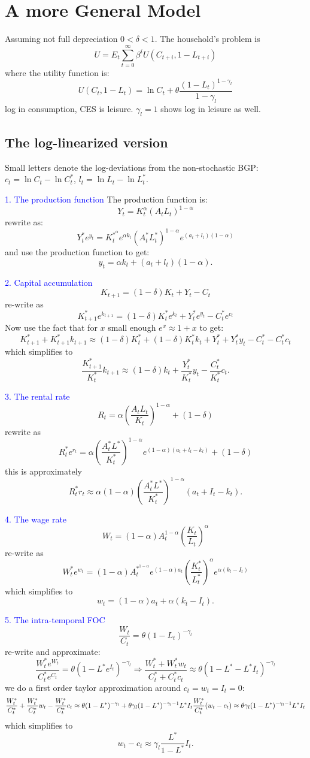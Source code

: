 \section{A more General Model}
Assuming not full depreciation $0 < \delta < 1$. The household's problem is
\[ 
U = E_t \sum_{t=0}^{\infty} \beta^i U(C_{t+i} , 1 - L_{t+i} )
\]
where the utility function is:
\[
U(C_t, 1-L_t) = \ln C_t + \theta \frac{(1-L_t)^{1-\gamma_l}}{1-\gamma_l}
\]
log in consumption, CES is leisure. $\gamma_l = 1$ shows log in leisure as well. 

\subsection{The log-linearized version}
Small letters denote the log-deviations from the non-stochastic BGP:
$c_t = \ln C_t - \ln C_t^{\ast}$, $l_t = \ln L_t - \ln L_t^{\ast}.$


\textcolor{blue}{1. The production function}
The production function is:
\[ Y_t = K_t^{\alpha} (A_t L_t)^{1-\alpha} \]
rewrite as:
\[ Y_t^{*} e^{y_t} = K^{*^{\alpha}} _t e^{\alpha k_t}(A_t^* L_t^*)^{1-\alpha }e^{(a_t + l_t)(1-\alpha )}  \]
and use the production function to get:
\[ y_t = \alpha k_t + (a_t + l_t)(1-\alpha ).\]

\textcolor{blue}{2. Capital accumulation}
$$K_{t+1}=(1-\delta)K_t+Y_t-C_t$$
re-write as
$$K_{t+1}^*e^{k_{t+1}}=(1-\delta)K_t^*e^{k_t}+Y_t^*e^{y_t}-C_t^*e^{c_t}$$
Now use the fact that for $x$ small enough $e^x\approx1+x$ to get:
$$K_{t+1}^{*}+K_{t+1}^{*}k_{t+1}\approx(1-\delta)K_{t}^{*}+(1-\delta)K_{t}^{*}k_{t}+Y_{t}^{*}+Y_{t}^{*}y_{t}-C_{t}^{*}-C_{t}^{*}c_{t}$$
which simplifies to
$$\frac{K_{t+1}^*}{K_t^*}k_{t+1}\approx(1-\delta)k_t+\frac{Y_t^*}{K_t^*}y_t-\frac{C_t^*}{K_t^*}c_t.$$

\textcolor{blue}{3. The rental rate}
$$R_t=\alpha\left(\frac{A_tL_t}{K_t}\right)^{1-\alpha}+(1-\delta)$$
rewrite as
$$R_t^*e^{r_t}=\alpha\left(\frac{A_t^*L^*}{K_t^*}\right)^{1-\alpha}e^{(1-\alpha)(a_t+l_t-k_t)}+(1-\delta)$$
this is approximately
$$R_t^*r_t\approx\alpha(1-\alpha)\left(\frac{A_t^*L^*}{K_t^*}\right)^{1-\alpha}(a_t+I_t-k_t).$$

\textcolor{blue}{4. The wage rate}
$$W_t=(1-\alpha)A_t^{1-\alpha}\left(\frac{K_t}{L_t}\right)^\alpha $$
re-write as
$$W_t^*e^{w_t}=(1-\alpha)A_t^{*^{1-\alpha}}e^{(1-\alpha)a_t}\left(\frac{K_t^*}{L_t^*}\right)^\alpha e^{\alpha(k_t-I_t)}$$
which simplifies to
$$w_t=(1-\alpha)a_t+\alpha(k_t-I_t).$$

\textcolor{blue}{5. The intra-temporal FOC}
$$\frac{W_t}{C_t}=\theta(1-L_t)^{-\gamma_l}$$
re-write and approximate:
$$\frac{W_t^*e^{W_t}}{C_t^*e^{C_t}}=\theta(1-L^*e^{I_t})^{-\gamma_l}\Rightarrow\frac{W_t^*+W_t^*w_t}{C_t^*+C_t^*c_t}\approx\theta(1-L^*-L^*I_t)^{-\gamma_l}$$
we do a first order taylor approximation around $c_t=w_t=I_t=0$:
$$\frac{W_t^*}{C_t^*}+\frac{W_t^*}{C_t^*}w_t-\frac{W_t^*}{C_t^*}c_t\approx\theta(1-L^*)^{-\gamma_l}+\theta\gamma_l(1-L^*)^{-\gamma_l-1}L^*I_t\\\frac{W_t^*}{C_t^*}(w_t-c_t)\approx\theta\gamma_l(1-L^*)^{-\gamma_l-1}L^*I_t$$
which simplifies to
$$w_t-c_t\approx\gamma_l\frac{L^*}{1-L^*}I_t.$$

